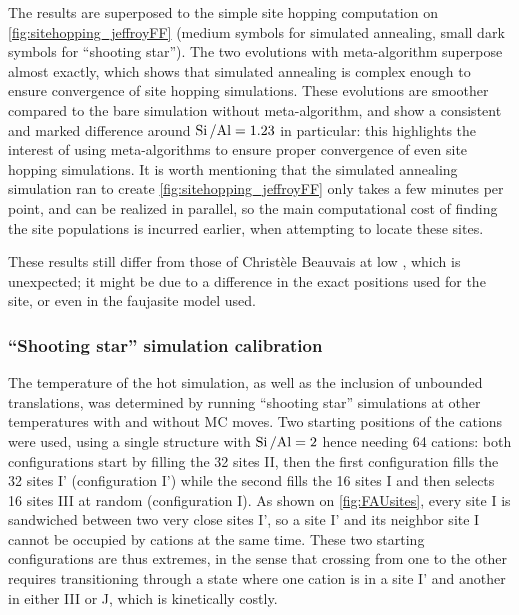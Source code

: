 \documentclass[main.tex]{subfiles}
\begin{document}
The results are superposed to the simple site hopping computation on \cref{fig:sitehopping_jeffroyFF} (medium symbols for simulated annealing, small dark symbols for ``shooting star''). The two evolutions with meta-algorithm superpose almost exactly, which shows that simulated annealing is complex enough to ensure convergence of site hopping simulations. These evolutions are smoother compared to the bare simulation without meta-algorithm, and show a consistent and marked difference around $\mbox{Si\,/Al} = 1.23$ in particular: this highlights the interest of using meta-algorithms to ensure proper convergence of even site hopping simulations. It is worth mentioning that the simulated annealing simulation ran to create \cref{fig:sitehopping_jeffroyFF} only takes a few minutes per point, and can be realized in parallel, so the main computational cost of finding the site populations is incurred earlier, when attempting to locate these sites.

These results still differ from those of Christèle Beauvais \cite{Beauvais} at low \SiAl, which is unexpected; it might be due to a difference in the exact positions used for the site, or even in the faujasite model used.

\subsubsection{``Shooting star'' simulation calibration}

The temperature of the hot simulation, as well as the inclusion of unbounded translations, was determined by running ``shooting star'' simulations at other temperatures with and without MC moves. Two starting positions of the cations were used, using a single structure with $\mbox{Si\,/Al} = 2$ hence needing 64 cations: both configurations start by filling the 32 sites II, then the first configuration fills the 32 sites I' (configuration I') while the second fills the 16 sites I and then selects 16 sites III at random (configuration I). As shown on \cref{fig:FAUsites}, every site I is sandwiched between two very close sites I', so a site I' and its neighbor site I cannot be occupied by cations at the same time. These two starting configurations are thus extremes, in the sense that crossing from one to the other requires transitioning through a state where one cation is in a site I' and another in either III or J, which is kinetically costly.
\end{document}
